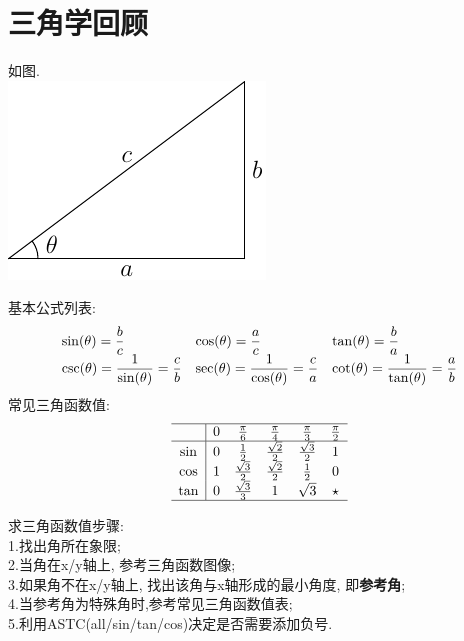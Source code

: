 \chapter{三角学回顾}
如图.\\
\includegraphics{triangel.pdf}

基本公式列表:\\
\begin{displaymath}
\begin{array}{l l l}
    \displaystyle\sin(\theta)=\frac{b}{c} & \displaystyle\cos(\theta)=\frac{a}{c} & \displaystyle\tan(\theta)=\frac{b}{a}\\
    \displaystyle\csc(\theta)=\frac{1}{\sin(\theta)}=\frac{c}{b} & \displaystyle\sec(\theta)=\frac{1}{\cos(\theta)}=\frac{c}{a} & \displaystyle\cot(\theta)=\frac{1}{\tan(\theta)}=\frac{a}{b}
\end{array}
\end{displaymath}
常见三角函数值:
\begin{displaymath}
\begin{array}{c|c c c c c}
\hline
    & 0 & \frac{\pi}{6} & \frac{\pi}{4} & \frac{\pi}{3} & \frac{\pi}{2}\\
\hline
    \sin & 0 & \frac{1}{2} & \frac{\sqrt{2}}{2} & \frac{\sqrt{3}}{2} & 1\\
    \cos & 1 & \frac{\sqrt{3}}{2} & \frac{\sqrt{2}}{2} & \frac{1}{2} & 0\\
    \tan & 0 & \frac{\sqrt{3}}{3} & 1 & \sqrt{3} & \star\\
\hline
\end{array}
\end{displaymath}

求三角函数值步骤:\\
1.找出角所在象限;\\
2.当角在x/y轴上, 参考三角函数图像;\\
3.如果角不在x/y轴上, 找出该角与x轴形成的最小角度, 即\textbf{参考角};\\
4.当参考角为特殊角时,参考常见三角函数值表;\\
5.利用ASTC(all/sin/tan/cos)决定是否需要添加负号.

